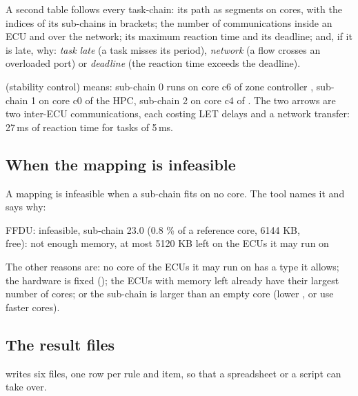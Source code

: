 
A second table follows every task-chain: its path as segments on cores,
with the indices of its sub-chains in brackets; the number of
communications inside an ECU and over the network; its maximum reaction
time and its deadline; and, if it is late, why: \emph{task late} (a task
misses its period), \emph{network} (a flow crosses an overloaded port) or
\emph{deadline} (the reaction time exceeds the deadline).

\listing[\fontsize{4.6pt}{5.6pt}\selectfont]{listings/uc1_chains.txt}

\begin{tip}
 (stability control) means:
sub-chain 0 runs on core c6 of zone controller , sub-chain 1
on core c0 of the HPC, sub-chain 2 on core c4 of . The two
arrows are two inter-ECU communications, each costing LET delays and a
network transfer: 27\,ms of reaction time for tasks of 5\,ms.
\end{tip}

\subsection{When the mapping is infeasible}
\label{sec:infeasible}

A mapping is infeasible when a sub-chain fits on no core. The tool names
it and says why:
\begin{shell}
FFDU: infeasible, sub-chain 23.0 (0.8 \% of a reference core, 6144 KB,\\
free): not enough memory, at most 5120 KB left on the ECUs it may run on
\end{shell}
The other reasons are: no core of the ECUs it may run on has a type it
allows; the hardware is fixed (); the ECUs with memory
left already have their largest number of cores; or the sub-chain is
larger than an empty core (lower , or use faster cores).

\subsection{The result files}
\label{sec:outfiles}

 writes six files, one row per rule and item, so that a
spreadsheet or a script can take over.

